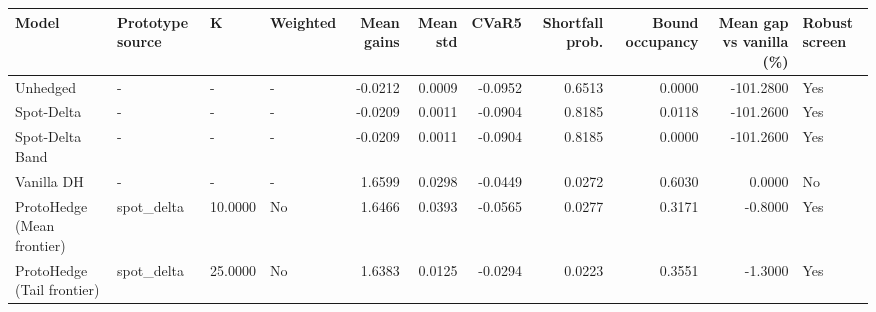 \begin{tabular}{llllrrrrrrl}
\toprule
Model & Prototype source & K & Weighted & Mean gains & Mean std & CVaR5 & Shortfall prob. & Bound occupancy & Mean gap vs vanilla (\%) & Robust screen \\
\midrule
Unhedged & - & - & - & -0.0212 & 0.0009 & -0.0952 & 0.6513 & 0.0000 & -101.2800 & Yes \\
Spot-Delta & - & - & - & -0.0209 & 0.0011 & -0.0904 & 0.8185 & 0.0118 & -101.2600 & Yes \\
Spot-Delta Band & - & - & - & -0.0209 & 0.0011 & -0.0904 & 0.8185 & 0.0000 & -101.2600 & Yes \\
Vanilla DH & - & - & - & 1.6599 & 0.0298 & -0.0449 & 0.0272 & 0.6030 & 0.0000 & No \\
ProtoHedge (Mean frontier) & spot\_delta & 10.0000 & No & 1.6466 & 0.0393 & -0.0565 & 0.0277 & 0.3171 & -0.8000 & Yes \\
ProtoHedge (Tail frontier) & spot\_delta & 25.0000 & No & 1.6383 & 0.0125 & -0.0294 & 0.0223 & 0.3551 & -1.3000 & Yes \\
\bottomrule
\end{tabular}